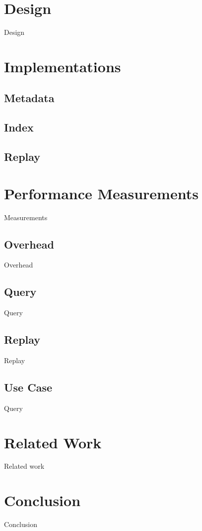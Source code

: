 \documentclass{sig-alternate}
\begin{document}
\section{Design}
\label{sec:Design}
Design

\section{Implementations}
\label{sec:Impl}

\subsection{Metadata}

\subsection{Index}

\subsection{Replay}

\section{Performance Measurements}
\label{sec:Perf}
Measurements

\subsection{Overhead}
Overhead

\subsection{Query}
Query

\subsection{Replay}
Replay

\subsection{Use Case}
Query

\section{Related Work}
\label{sec:Related}
Related work

\section{Conclusion}
\label{sec:Conclusion}
Conclusion
\end{document}
